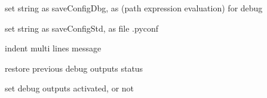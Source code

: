 \documentclass[a4paper,10pt,english]{sphinxmanual}
\begin{document}

\begin{fulllineitems}
\label{\detokenize{commands/apidoc/src:src.debug.getStrConfigDbg}}
set string as saveConfigDbg, 
as (path expression evaluation) for debug

\end{fulllineitems}


\begin{fulllineitems}
\label{\detokenize{commands/apidoc/src:src.debug.getStrConfigStd}}
set string as saveConfigStd, as file .pyconf

\end{fulllineitems}


\begin{fulllineitems}
\label{\detokenize{commands/apidoc/src:src.debug.indent}}
indent multi lines message

\end{fulllineitems}


\begin{fulllineitems}
\label{\detokenize{commands/apidoc/src:src.debug.pop_debug}}
restore previous debug outputs status

\end{fulllineitems}


\begin{fulllineitems}
\label{\detokenize{commands/apidoc/src:src.debug.push_debug}}
set debug outputs activated, or not

\end{fulllineitems}
\end{document}
